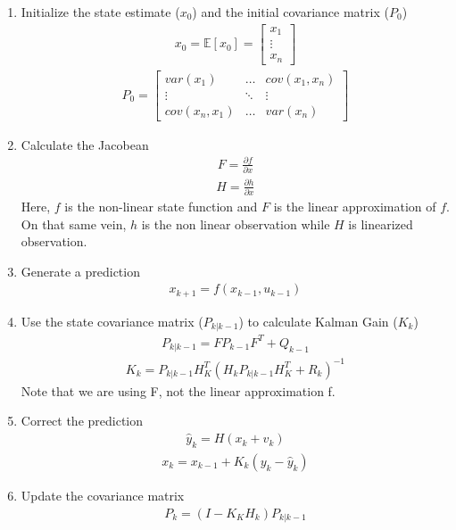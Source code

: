\begin{enumerate}
  \item Initialize the state estimate ($x_0$) and the initial covariance matrix ($P_0$) 
  \begin{align*}
        x_0 = \mathbb{E}[x_0]  = \begin{bmatrix}
           x_1 \\
           \vdots \\
           x_n 
         \end{bmatrix} 
    \end{align*}
  \begin{align*}
      P_0 =
      \begin{bmatrix}
           var(x_1)  & \hdots & cov(x_1, x_n) \\
           \vdots & \ddots & \vdots \\
           cov(x_n, x_1)  & \hdots & var(x_n )
         \end{bmatrix} 
  \end{align*}
  \item Calculate the Jacobean
  \begin{align*}
      F= \frac{\partial f}{\partial x}
  \end{align*}
  \begin{align*}
      H = \frac{\partial h}{\partial x}
  \end{align*}
  Here, $f$ is the non-linear state function and $F$ is the linear approximation of $f$. On that same vein, $h$ is the non linear observation while $H$ is linearized observation.
  \item Generate a prediction 
  \begin{align*}
      x_{k+1} = f( x_{k-1} , u_{k-1})  
  \end{align*} 
  \item Use the state covariance matrix ($P_{k | k - 1}$) to calculate Kalman Gain ($K_k$) 
    \begin{align*} 
        P_{k | k -1} = F P_{k - 1} F^T + Q_{k-1} 
        \end{align*}
         \begin{align*} 
        K_k = P_{k | k - 1} H^T_K (H_k P_{k | k - 1} H^T_K + R_k)^{-1}
    \end{align*}
    Note that we are using F, not the linear approximation f.
    \item  Correct the prediction
    \begin{align*}
        \hat y_k = H( x_k + v_k )
    \end{align*}
     \begin{align*} 
        x_k = x_{k - 1} + K_k(y_k - \hat y_k)
    \end{align*}
    \item Update the covariance matrix
    \begin{align*} 
        P_k = (I - K_K H_k) P_{k | k-1}
    \end{align*}
\end{enumerate} 
